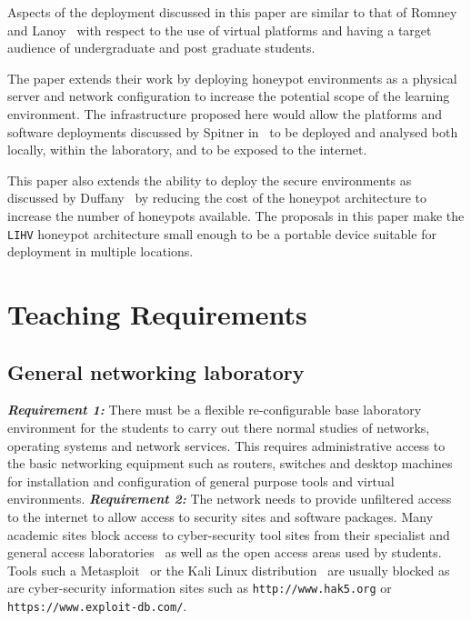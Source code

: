Aspects of the deployment discussed in this paper are similar to that of Romney and Lanoy~\cite{LR:06} with respect to the use of virtual platforms and having a target audience of undergraduate and post graduate students. 

The paper extends their work by deploying honeypot environments as a physical server and network configuration to increase the potential scope of the learning environment. The infrastructure proposed here would allow the platforms and software deployments discussed by Spitner in~\cite{LS:03} to be deployed and analysed both locally, within the laboratory, and to be exposed to the internet. 

This paper also extends the ability to deploy the secure environments as discussed by Duffany~\cite{JD:08} by reducing the cost of the honeypot architecture to increase the number of honeypots available. The proposals in this paper make the \texttt{LIHV} honeypot architecture small enough to be a portable device suitable for deployment in multiple locations.

\section{Teaching Requirements}\label{sec:TeachingRequire}

\subsection{General networking laboratory}\label{subsec:GeneralLab}
\noindent \emph{\textbf{Requirement 1:}} There must be a flexible re-configurable base laboratory environment for the students to carry out there normal studies of networks, operating systems and network services. This requires administrative access to the basic networking equipment such as routers, switches and desktop machines for installation and configuration of general purpose tools and virtual environments.
\newline\newline
\noindent \emph{\textbf{Requirement 2:}} The network needs to provide unfiltered access to the internet to allow access to security sites and software packages. Many academic sites block access to cyber-security tool sites from their specialist and general access laboratories~\cite{ACGO:06,YYLCHJ:04} as well as the open access areas used by students. Tools such a Metasploit~\cite{R7:17} or the Kali Linux distribution~\cite{OS:17} are usually blocked as are cyber-security information sites such as \texttt{http://www.hak5.org} or \texttt{https://www.exploit-db.com/}.

